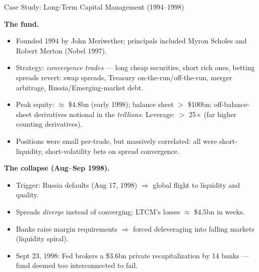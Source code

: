 

\begin{frame}[shrink=10]{Case Study: Long-Term Capital Management (1994--1998)}

\small

\textbf{\textcolor{inkblue}{The fund.}}
\vspace{0.3em}

\begin{itemize}
  \item Founded 1994 by John Meriwether; principals included Myron Scholes and Robert Merton (Nobel 1997).
  \item Strategy: \emph{convergence trades} --- long cheap securities, short rich ones, betting spreads revert:
        swap spreads, Treasury on-the-run/off-the-run, merger arbitrage, Russia/Emerging-market debt.
  \item Peak equity: $\approx$ \$4.8bn (early 1998); balance sheet $>$ \$100bn;
        off-balance-sheet derivatives notional in the \emph{trillions}.
        Leverage: $>$ 25$\times$ (far higher counting derivatives).
  \item Positions were small per-trade, but \textcolor{cinnabar}{massively correlated}: all were short-liquidity,
        short-volatility bets on spread convergence.
\end{itemize}

\vspace{0.5em}

\textbf{\textcolor{inkblue}{The collapse (Aug--Sep 1998).}}
\vspace{0.3em}

\begin{itemize}
  \item Trigger: Russia defaults (Aug 17, 1998) $\Rightarrow$ global flight to liquidity and quality.
  \item Spreads \emph{diverge} instead of converging; LTCM's losses $\approx$ \$4.5bn in weeks.
  \item Banks raise margin requirements $\Rightarrow$ forced deleveraging into falling markets
        (liquidity spiral).
  \item Sept 23, 1998: Fed brokers a \$3.6bn private recapitalization by 14 banks
        --- fund deemed too interconnected to fail.
\end{itemize}

\end{frame}

